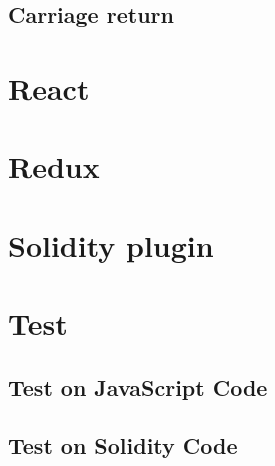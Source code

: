 \documentclass[ManualeSviluppatore.tex]{subfiles}
\begin{document}
\subsection{Carriage return}

\section{React}

\section{Redux}

\section{Solidity plugin}

\section{Test}

\subsection{Test on JavaScript Code}

\subsection{Test on Solidity Code}
\end{document}
